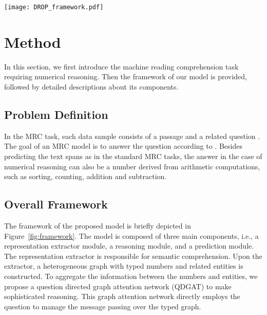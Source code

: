 \documentclass{article}
\begin{document}
\begin{figure*}
\centering
\texttt{[image: DROP\_framework.pdf]}
\vspace{-4mm}
\caption{
The framework of our model. It consists of a representation extractor (left), a reasoning module (middle) and a prediction module (right).
The reasoning module reasons over a heterogeneous directed graph whose nodes are the numbers and the entities.
Two kinds of relations are encoded: (1) the numbers of the same type are connected with each other by the type-specific edges, (2) the entities and the numbers are connected when they co-occur in a sentence.
The reasoning is conditioned on the question explicitly to guide the message propagation over the graph.
In each iteration, each node selectively receives the messages from the neighboring nodes with the question representation to update its representation.
The derived representations of these nodes are then combined with the RoBERTa output for the final prediction module.
The dashed circle means zero vector.
} 
\label{fig:framework}
\end{figure*}

\section{Method}
In this section, we first introduce the machine reading comprehension task requiring numerical reasoning. Then the framework of our model is provided, followed by detailed descriptions about its components.

\subsection{Problem Definition}
In the MRC task, each data sample consists of a passage  and a related question .
The goal of an MRC model is to answer the question according to .
Besides predicting the text spans as in the standard MRC tasks, the answer  in the case of numerical reasoning can also be a number derived from arithmetic computations, such as sorting, counting, addition and subtraction.





\subsection{Overall Framework}
The framework of the proposed model is briefly depicted in Figure~\ref{fig:framework}.
The model is composed of three main components, i.e., a representation extractor module, a reasoning module, and a prediction module.
The representation extractor is responsible for semantic comprehension.
Upon the extractor, a heterogeneous graph with typed numbers and related entities is constructed.
To aggregate the information between the numbers and entities, we propose a question directed graph attention network (QDGAT) to make sophisticated reasoning.
This graph attention network directly employs the question  to manage the message passing over the typed graph.
\end{document}
